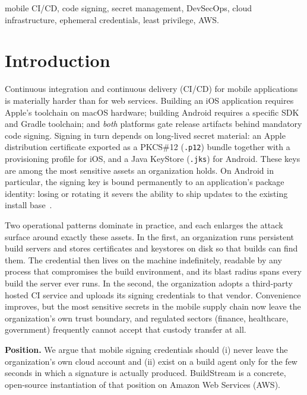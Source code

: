 \documentclass[conference]{IEEEtran}
\begin{document}
\begin{IEEEkeywords}
mobile CI/CD, code signing, secret management, DevSecOps, cloud infrastructure,
ephemeral credentials, least privilege, AWS.
\end{IEEEkeywords}

\section{Introduction}
Continuous integration and continuous delivery (CI/CD) for mobile applications
is materially harder than for web services. Building an iOS application requires
Apple's toolchain on macOS hardware; building Android requires a specific SDK
and Gradle toolchain; and \emph{both} platforms gate release artifacts behind
mandatory code signing. Signing in turn depends on long-lived secret material:
an Apple distribution certificate exported as a PKCS\#12 (\texttt{.p12}) bundle
together with a provisioning profile for iOS, and a Java KeyStore
(\texttt{.jks}) for Android. These keys are among the most sensitive assets an
organization holds. On Android in particular, the signing key is bound
permanently to an application's package identity: losing or rotating it severs
the ability to ship updates to the existing install base~\cite{androidsign}.

Two operational patterns dominate in practice, and each enlarges the attack
surface around exactly these assets. In the first, an organization runs
persistent build servers and stores certificates and keystores on disk so that
builds can find them. The credential then lives on the machine indefinitely,
readable by any process that compromises the build environment, and its blast
radius spans every build the server ever runs. In the second, the organization
adopts a third-party hosted CI service and uploads its signing credentials to
that vendor. Convenience improves, but the most sensitive secrets in the mobile
supply chain now leave the organization's own trust boundary, and regulated
sectors (finance, healthcare, government) frequently cannot accept that
custody transfer at all.

\textbf{Position.} We argue that mobile signing credentials should (i) never
leave the organization's own cloud account and (ii) exist on a build agent only
for the few seconds in which a signature is actually produced. BuildStream is a
concrete, open-source instantiation of that position on Amazon Web Services
(AWS).
\end{document}
